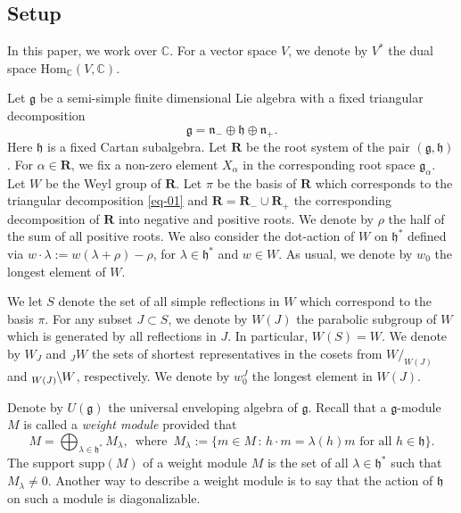 \documentclass[a4paper]{amsart}
\begin{document}
\subsection{Setup}\label{s1.1}

In this paper, we work over $\mathbb{C}$. For a vector space $V$,
we denote by $V^*$ the dual space $\mathrm{Hom}_\mathbb{C}(V,\mathbb{C})$.

Let $\mathfrak{g}$ be a 
semi-simple finite dimensional Lie algebra with a fixed triangular 
decomposition
\begin{equation}\label{eq-01}
\mathfrak{g}=\mathfrak{n}_-\oplus \mathfrak{h}\oplus \mathfrak{n}_+. 
\end{equation}
Here $\mathfrak{h}$ is a fixed Cartan subalgebra. Let $\mathbf{R}$
be the root system of the pair $(\mathfrak{g},\mathfrak{h})$.
For $\alpha\in \mathbf{R}$, we fix a non-zero element
$X_\alpha$ in the corresponding root space $\mathfrak{g}_\alpha$.
Let $W$ be the Weyl group of $\mathbf{R}$. Let $\pi$ be the basis of
$\mathbf{R}$ which corresponds to the triangular decomposition
\eqref{eq-01} and $\mathbf{R}=\mathbf{R}_-\cup \mathbf{R}_+$ the corresponding
decomposition of $\mathbf{R}$ into negative and positive roots.
We denote by $\rho$ the half of the sum of all positive roots.
We also consider the dot-action of $W$ on $\mathfrak{h}^*$
defined via $w\cdot \lambda:=w(\lambda+\rho)-\rho$, for
$\lambda\in \mathfrak{h}^*$ and $w\in W$. As usual, we denote
by $w_0$ the longest element of $W$.

We let $S$ denote the set of all simple reflections in $W$ which 
correspond to the basis $\pi$. For any subset $J\subset S$,
we denote by $W(J)$ the parabolic subgroup of $W$ which is generated
by all reflections in $J$. In particular, $W(S)=W$.
We denote by $W_J$ and ${}_JW$ the sets of shortest representatives
in the cosets from $W/_{W(J)}$ and 
${}_{W(J)}\hspace{-1mm}\setminus\hspace{-1mm} W$, respectively.
We denote by $w_0^{J}$ the longest element in $W(J)$.

Denote by $U(\mathfrak{g})$ the universal enveloping algebra of 
$\mathfrak{g}$.
Recall that a $\mathfrak{g}$-module $M$ is called a {\em weight module}
provided that
\begin{displaymath}
M=\bigoplus_{\lambda\in\mathfrak{h}^*}M_\lambda, \,
\text{ where } \,
M_\lambda:=\{m\in M\,:\, h\cdot m =\lambda(h)m\text{ for all }
h\in\mathfrak{h}\}.
\end{displaymath}
The support $\mathrm{supp}(M)$ of a weight module $M$ is the set of all
$\lambda\in \mathfrak{h}^*$ such that $M_\lambda\neq 0$.
Another way to describe a weight module is to say that the 
action of $\mathfrak{h}$ on such a module is diagonalizable.
\end{document}

